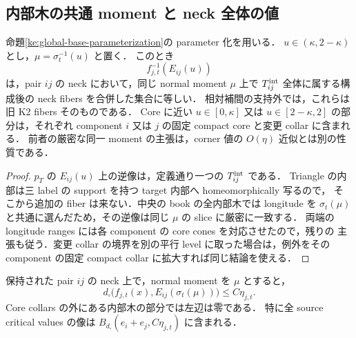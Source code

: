 \subsection{内部木の共通 moment と neck 全体の値}

\begin{proposition}
\label{ke:collapsed-tree-common-moment}
命題\ref{ke:global-base-parameterization}の parameter 化を用いる．
$u\in(\kappa,2-\kappa)$ とし，$\mu=\sigma_t^{-1}(u)$ と置く．
このとき
\[
 f_{j,t}^{-1}(E_{ij}(u))
\]
は，pair $ij$ の neck において，同じ normal moment $\mu$ 上で
$T_{ij}^{\rm int}$ 全体に属する構成後の neck fibers を合併した集合に等しい．
相対補間の支持外では，これらは旧 K2 fibers そのものである．
Core に近い $u\in[0,\kappa]$ 又は $u\in[2-\kappa,2]$ の部分は，それぞれ
component $i$ 又は $j$ の固定 compact core と変更 collar に含まれる．
前者の厳密な同一 moment の主張は，corner 値の $O(\eta)$ 近似とは別の性質である．
\end{proposition}

\begin{proof}
$p_T$ の $E_{ij}(u)$ 上の逆像は，定義通り一つの $T_{ij}^{\rm int}$ である．
Triangle の内部は三 label の support を持つ target 内部へ homeomorphically 写るので，
そこから追加の fiber は来ない．中央の book の全内部木では longitude を
$\sigma_t(\mu)$ と共通に選んだため，その逆像は同じ $\mu$ の slice に厳密に一致する．
両端の longitude ranges には各 component の core cones を対応させたので，残りの
主張も従う．変更 collar の境界を別の平行 level に取った場合は，例外をその
component の固定 compact collar に拡大すれば同じ結論を使える．
\end{proof}

\begin{corollary}
\label{ke:neck-base-value-control}
保持された pair $ij$ の neck 上で，normal moment を $\mu$ とすると，
\[
 d_\square\bigl(f_{j,t}(x),E_{ij}(\sigma_t(\mu))\bigr)\le C\eta_{j,t}.
\]
Core collars の外にある内部木の部分では左辺は零である．
特に全 source critical values の像は
$B_{d_\square}(e_i+e_j,C\eta_{j,t})$ に含まれる．
\end{corollary}

